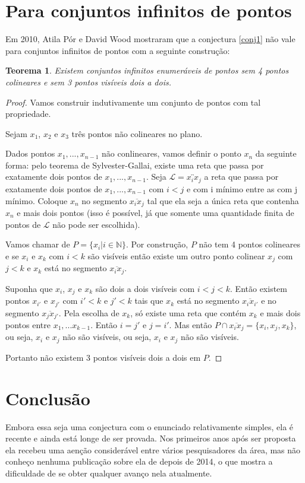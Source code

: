 \documentclass[a4paper]{book}
\newtheorem{teorema}{Teorema}
\begin{document}
\section{Para conjuntos infinitos de pontos}
Em 2010\cite{infinity}, Atila Pór e David Wood mostraram que a conjectura \ref{conj1} não vale para conjuntos infinitos de pontos com a seguinte construção:

\begin{teorema}
    Existem conjuntos infinitos enumeráveis de pontos sem 4 pontos colineares e sem 3 pontos visíveis dois a dois.
\end{teorema}
\begin{proof}
    Vamos construir indutivamente um conjunto de pontos com tal propriedade.

    Sejam $x_1$, $x_2$ e $x_3$ três pontos não colineares no plano.

    Dados pontos $x_1,...,x_{n-1}$ não conlineares, vamos definir o ponto $x_n$ da seguinte forma: pelo teorema de Sylvester-Gallai, existe uma reta que passa por exatamente dois pontos de $x_1,...,x_{n-1}$. Seja $\mathcal L=\overleftrightarrow{x_ix_j}$ a reta que passa por exatamente dois pontos de $x_1,...,x_{n-1}$ com $i<j$ e com i mínimo entre as com j mínimo. Coloque $x_n$ no segmento $\overline{x_ix_j}$ tal que ela seja a única reta que contenha $x_n$ e mais dois pontos (isso é possível, já que somente uma quantidade finita de pontos de $\mathcal L$ não pode ser escolhida).

    Vamos chamar de $P = \{x_i|i\in \mathbb N\}$. Por construção, $P$ não tem 4 pontos colineares e se $x_i$ e $x_k$ com $i<k$ são visíveis então existe um outro ponto colinear $x_j$ com $j<k$ e $x_k$ está no segmento $\overline{x_ix_j}$.

    Suponha que $x_i$, $x_j$ e $x_k$ são dois a dois visíveis com $i<j<k$. Então existem pontos $x_{i'}$ e $x_{j'}$ com $i'<k$ e $j'<k$ tais que $x_k$ está no segmento $\overline{x_ix_{i'}}$ e no segmento $\overline{x_jx_{j'}}$. Pela escolha de $x_k$, só existe uma reta que contém $x_k$ e mais dois pontos entre $x_1,...x_{k-1}$. Então $i=j'$ e $j=i'$. Mas então $P\cap\overline{x_ix_j}=\{x_i,x_j,x_k\}$, ou seja, $x_i$ e $x_j$ não são visíveis, ou seja, $x_i$ e $x_j$ não são visíveis.

    Portanto não existem 3 pontos visíveis dois a dois em $P$.

\end{proof}

\section{Conclusão}
Embora essa seja uma conjectura com o enunciado relativamente simples, ela é recente e ainda está longe de ser provada. Nos primeiros anos após ser proposta ela recebeu uma aenção considerável entre vários pesquisadores da área, mas não conheço nenhuma publicação sobre ela de depois de 2014, o que mostra a dificuldade de se obter qualquer avanço nela atualmente.
\end{document}
